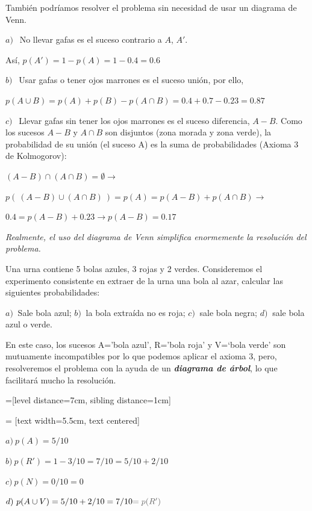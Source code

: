 \begin{ejemplo}
También podríamos resolver el problema sin necesidad de usar un diagrama de Venn.

$a)\ \ $ No llevar gafas es el suceso contrario a $A$, $A'$. 

Así, $p(A')=1-p(A)=1-0.4=0.6$

$b)\ \ $ Usar gafas o tener ojos marrones es el suceso unión, por ello, 

$p(A\cup B)=p(A)+p(B)-p(A\cap B)=0.4+0.7-0.23=0.87$

$c)\ \ $ Llevar gafas sin tener los ojos marrones es el suceso diferencia, $A-B$. Como los sucesos $A-B$ y $A\cap B$ son disjuntos (zona morada y zona verde), la probabilidad de su unión (el suceso A) es la suma de probabilidades (Axioma 3 de Kolmogorov):

$(A-B) \cap (A\cap B)=\emptyset \to $

$p(\ (A-B) \cup (A\cap B) \ )= p(A) =p(A-B) + p(A\cap B) \to $

$0.4=p(A-B)+0.23 \to p(A-B)=0.17$

\emph{Realmente, el uso del diagrama de Venn simplifica enormemente la resolución del problema.}
\end{ejemplo}
	
\begin{ejemplo}
\begin{ejre}
Una urna contiene 5 bolas azules, 3 rojas y 2 verdes. Consideremos el experimento consistente en extraer de la urna una bola al azar, calcular las siguientes probabilidades:

$a)\ $ Sale bola azul; $b)\ $ la bola extraída no es roja; $c)\ $ sale bola negra; $d)\ $ sale bola azul o verde.	
\end{ejre}

\vspace{4mm} En este caso, los sucesos A='bola azul', R='bola roja' y V=`bola verde' son mutuamente incompatibles por lo que podemos aplicar el axioma 3, pero, resolveremos el problema con la ayuda de un \textbf{\emph{diagrama de árbol}}, lo que facilitará mucho la resolución.	


=[level distance=7cm, sibling distance=1cm]

 = [text width=5.5cm, text centered]

\begin{center}
\end{center}
	
$a)\ p(A)=5/10$

$b)\ p(R')=1-3/10=7/10=5/10+2/10$

$c)\ p(N)=0/10=0$

$d)\ p(A\cup V)=5/10+2/10=7/10 \textcolor{gris}{=p(R')}$
\end{ejemplo}

